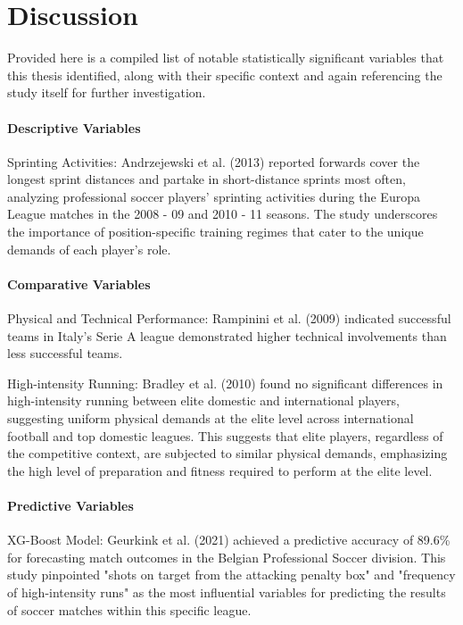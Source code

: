 \chapter{Discussion}

Provided here is a compiled list of notable statistically significant variables that this thesis identified, along with their specific context and again referencing the study itself for further investigation.

\subsubsection{Descriptive Variables}

Sprinting Activities: Andrzejewski et al. (2013) \cite{Andrzejewski2013} reported forwards cover the longest sprint distances and partake in short-distance sprints most often, analyzing professional soccer players' sprinting activities during the Europa League matches in the 2008 - 09 and 2010 - 11 seasons. The study underscores the importance of position-specific training regimes that cater to the unique demands of each player's role.

\subsubsection{Comparative Variables}
Physical and Technical Performance: Rampinini et al. (2009) \cite{Rampinini2009} indicated successful teams in Italy’s Serie A league demonstrated higher technical involvements than less successful teams.

High-intensity Running: Bradley et al. (2010) \cite{Bradley2010} found no significant differences in high-intensity running between elite domestic and international players, suggesting uniform physical demands at the elite level across international football and top domestic leagues. This suggests that elite players, regardless of the competitive context, are subjected to similar physical demands, emphasizing the high level of preparation and fitness required to perform at the elite level. 

\subsubsection{Predictive Variables}
XG-Boost Model: Geurkink et al. (2021) \cite{Geurkink2021} achieved a predictive accuracy of 89.6\% for forecasting match outcomes in the Belgian Professional Soccer division. This study pinpointed "shots on target from the attacking penalty box" and "frequency of high-intensity runs" as the most influential variables for predicting the results of soccer matches within this specific league.

